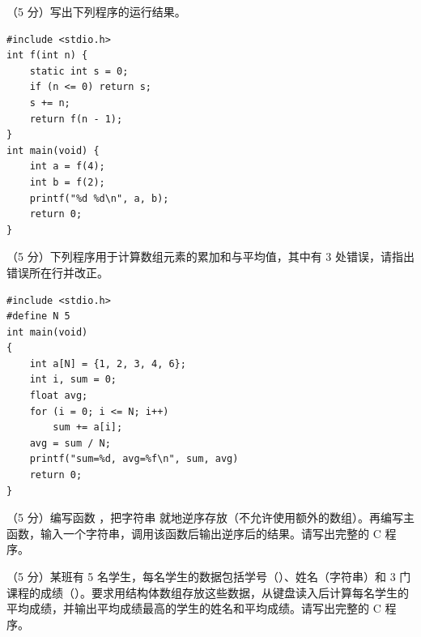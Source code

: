 \documentclass[a4paper,11pt]{article}
\begin{document}
\begin{qgroup}
\q （5 分）写出下列程序的运行结果。
\begin{lstlisting}[language={[custom]C}]
#include <stdio.h>
int f(int n) {
    static int s = 0;
    if (n <= 0) return s;
    s += n;
    return f(n - 1);
}
int main(void) {
    int a = f(4);
    int b = f(2);
    printf("%d %d\n", a, b);
    return 0;
}
\end{lstlisting}
\anslines{1.5cm}

\q （5 分）下列程序用于计算数组元素的累加和与平均值，其中有 3 处错误，请指出错误所在行并改正。
\begin{lstlisting}[language={[custom]C}]
#include <stdio.h>
#define N 5
int main(void)
{
    int a[N] = {1, 2, 3, 4, 6};
    int i, sum = 0;
    float avg;
    for (i = 0; i <= N; i++)
        sum += a[i];
    avg = sum / N;
    printf("sum=%d, avg=%f\n", sum, avg)
    return 0;
}
\end{lstlisting}
\anslines{2.0cm}
\end{qgroup}

\begin{qgroup}
\q （5 分）编写函数 ，把字符串  就地逆序存放（不允许使用额外的数组）。再编写主函数，输入一个字符串，调用该函数后输出逆序后的结果。请写出完整的 C 程序。
\anslines{5.0cm}

\q （5 分）某班有 5 名学生，每名学生的数据包括学号（）、姓名（字符串）和 3 门课程的成绩（）。要求用结构体数组存放这些数据，从键盘读入后计算每名学生的平均成绩，并输出平均成绩最高的学生的姓名和平均成绩。请写出完整的 C 程序。
\anslines{5.0cm}
\end{qgroup}
\end{document}
